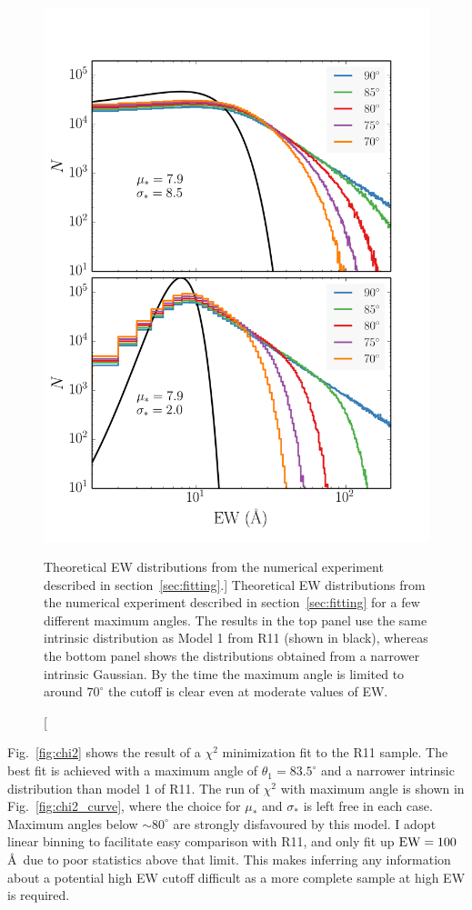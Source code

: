 \begin{figure}
\centering
\includegraphics[width=1.0\textwidth]{figures/ewpaper/cutoff.png}
\caption
[Theoretical EW distributions from the numerical experiment 
described in section~\ref{sec:fitting}.]
{
Theoretical EW distributions from the numerical experiment 
described in section~\ref{sec:fitting} for a few different 
maximum angles. The results in the top panel use the same intrinsic
distribution as Model 1 from R11 (shown in black), 
whereas the bottom panel shows the distributions 
obtained from a narrower intrinsic Gaussian. By the time the maximum
angle is limited to around $70^\circ$ the cutoff is
clear even at moderate values of EW.
}
\label{fig:cutoff}
\end{figure}

Fig.~\ref{fig:chi2} shows the result of a $\chi^2$ minimization fit 
to the R11 sample. The best fit is achieved with a maximum angle of 
$\theta_{1}=83.5^\circ$ and a narrower intrinsic distribution
than model 1 of R11. The run of $\chi^2$ with maximum angle
is shown in Fig.~\ref{fig:chi2_curve}, where the choice for $\mu_*$
and $\sigma_*$ is left free in each case. 
Maximum angles below $\sim80^\circ$ are strongly disfavoured
by this model. I adopt linear binning to facilitate easy comparison 
with R11, and only fit up ${\rm EW}=100$\AA\
due to poor statistics above that limit. This 
makes inferring any information about a potential high EW cutoff 
difficult as a more complete sample at high EW is required. 

